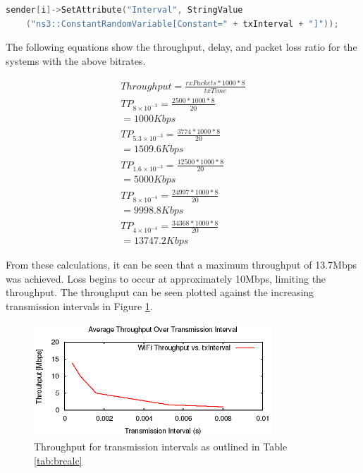 \begin{lstlisting}[language=C++, caption=Transmission Interval Code Snippet]
	sender[i]->SetAttribute("Interval", StringValue
	("ns3::ConstantRandomVariable[Constant=" + txInterval + "]"));
\end{lstlisting}

\par The following equations show the throughput, delay, and packet loss ratio
for the systems with the above bitrates.

\begin{gather*}
	Throughput=\frac{rxPackets*1000*8}{txTime} \\
	TP_{8\times10^{-3}}=\frac{2500*1000*8}{20} \\
	= 1000Kbps \\
	TP_{5.3\times10^{-3}}=\frac{3774*1000*8}{20} \\
	= 1509.6Kbps \\
	TP_{1.6\times10^{-3}}=\frac{12500*1000*8}{20} \\
	= 5000Kbps \\
	TP_{8\times10^{-4}}=\frac{24997*1000*8}{20} \\
	= 9998.8Kbps \\
	TP_{4\times10^{-4}}=\frac{34368*1000*8}{20} \\
	= 13747.2Kbps
\end{gather*}

\par From these calculations, it can be seen that a maximum throughput of
13.7Mbps was achieved. Loss begins to occur at approximately 10Mbps, limiting
the throughput. The throughput can be seen plotted against the increasing
transmission intervals in Figure \ref{fig:QAP2Throughput}.

\begin{figure}[H]
	\centering
	\includegraphics[width=0.8\textwidth]{images/EE500/QA/P2/Images/wifi-throughput}
	\caption{Throughput for transmission intervals as outlined in
	Table \ref{tab:brcalc}}
	\label{fig:QAP2Throughput}
\end{figure}

